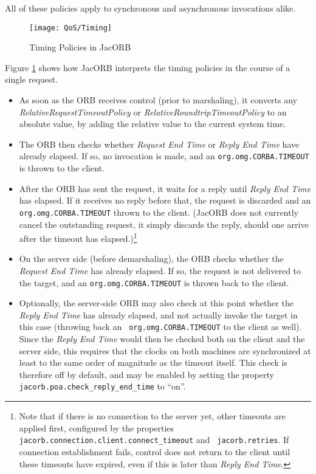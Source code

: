 All of these policies apply to synchronous and asynchronous
invocations alike.

\begin{figure}[htb]
  \begin{center}
    \texttt{[image: QoS/Timing]}
  \end{center}
\caption{Timing Policies in JacORB}
\label{fig:timing}
\end{figure}

Figure \ref{fig:timing} shows how JacORB interprets the timing
policies in the course of a single request.

\begin{itemize}
\item As soon as the ORB receives control (prior to marshaling), it
converts any \emph{RelativeRequestTimeoutPolicy} or
\emph{RelativeRoundtripTimeoutPolicy} to an absolute value, by adding
the relative value to the current system time.

\item The ORB then checks whether \emph{Request End Time} or
\emph{Reply End Time} have already elapsed.  If so, no invocation is
made, and an {\tt org.omg.CORBA.TIMEOUT} is thrown to the client.

\item After the ORB has sent the request, it waits for a reply until
\emph{Reply End Time} has elapsed.  If it receives no reply before
that, the request is discarded and an {\tt org.omg.CORBA.TIMEOUT}
thrown to the client.  (JacORB does not currently cancel the
outstanding request, it simply discards the reply, should one arrive
after the timeout has elapsed.)\footnote{Note that if there is no
  connection to the server yet, other timeouts are applied first,
configured by the properties {\tt
  jacorb.connection.client.connect\_timeout} and {\tt
  jacorb.retries}.  If connection establishment fails, control does
not return to the client until these timeouts have expired, even if
this is later than \emph{Reply End Time}.}

\item On the server side (before demarshaling), the ORB checks whether
the \emph{Request End Time} has already elapsed.  If so, the request
is not delivered to the target, and an {\tt org.omg.CORBA.TIMEOUT}
is thrown back to the client.

\item Optionally, the server-side ORB may also check at this point
whether the \emph{Reply End Time} has already elapsed, and not
actually invoke the target in this case (throwing back an {\tt
org.omg.CORBA.TIMEOUT} to the client as well).  Since the \emph{Reply
  End Time} would then be checked both on the client and the server
side, this requires that the clocks on both machines are synchronized
at least to the same order of magnitude as the timeout itself.  This
check is therefore off by default, and may be enabled by setting the
property {\tt jacorb.poa.check\_reply\_end\_time} to ``on''.


\end{itemize}
